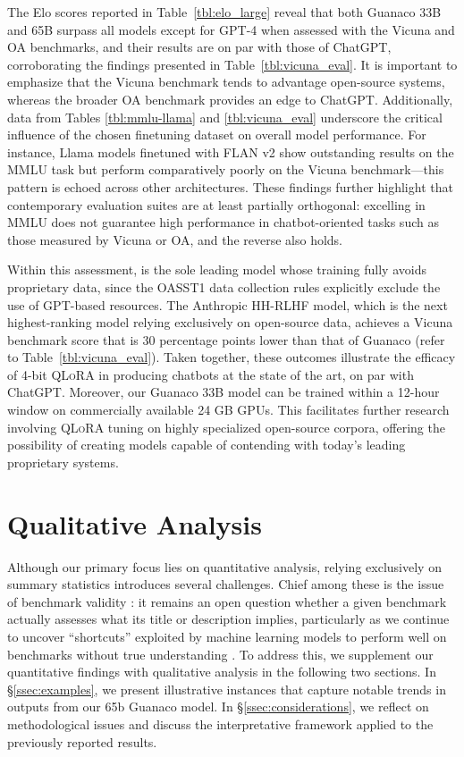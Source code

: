 The Elo scores reported in Table~\ref{tbl:elo_large} reveal that both {Guanaco} 33B and 65B surpass all models except for GPT-4 when assessed with the Vicuna and OA benchmarks, and their results are on par with those of ChatGPT, corroborating the findings presented in Table~\ref{tbl:vicuna_eval}. It is important to emphasize that the Vicuna benchmark tends to advantage open-source systems, whereas the broader OA benchmark provides an edge to ChatGPT. Additionally, data from Tables \ref{tbl:mmlu-llama} and \ref{tbl:vicuna_eval} underscore the critical influence of the chosen finetuning dataset on overall model performance. For instance, Llama models finetuned with FLAN v2 show outstanding results on the MMLU task but perform comparatively poorly on the Vicuna benchmark—this pattern is echoed across other architectures. These findings further highlight that contemporary evaluation suites are at least partially orthogonal: excelling in MMLU does not guarantee high performance in chatbot-oriented tasks such as those measured by Vicuna or OA, and the reverse also holds. 

Within this assessment, is the sole leading model whose training fully avoids proprietary data, since the OASST1 data collection rules explicitly exclude the use of GPT-based resources. The Anthropic HH-RLHF model, which is the next highest-ranking model relying exclusively on open-source data, achieves a Vicuna benchmark score that is 30 percentage points lower than that of {Guanaco} (refer to Table~\ref{tbl:vicuna_eval}). Taken together, these outcomes illustrate the efficacy of 4-bit \textsc{QLoRA} in producing chatbots at the state of the art, on par with ChatGPT. Moreover, our {Guanaco} 33B model can be trained within a 12-hour window on commercially available 24 GB GPUs. This facilitates further research involving \textsc{QLoRA} tuning on highly specialized open-source corpora, offering the possibility of creating models capable of contending with today’s leading proprietary systems.

\section{Qualitative Analysis}

Although our primary focus lies on quantitative analysis, relying exclusively on summary statistics introduces several challenges. Chief among these is the issue of benchmark validity \citep{liao2021we}: it remains an open question whether a given benchmark actually assesses what its title or description implies, particularly as we continue to uncover ``shortcuts'' exploited by machine learning models to perform well on benchmarks without true understanding \citep{gururangan2018annotation, poliak2018hypothesis}. To address this, we supplement our quantitative findings with qualitative analysis in the following two sections. In \S\ref{ssec:examples}, we present illustrative instances that capture notable trends in outputs from our 65b {Guanaco} model. In \S\ref{ssec:considerations}, we reflect on methodological issues and discuss the interpretative framework applied to the previously reported results.


